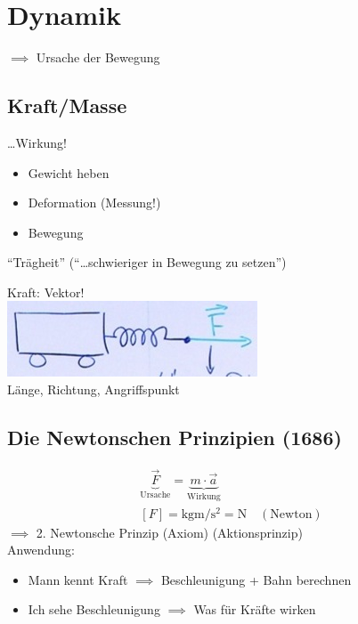 \section{Dynamik}
$\implies$ Ursache der Bewegung
\subsection{Kraft/Masse}
\begin{def*}[ note = Kraft , index = Kraft ]
	\dots Wirkung!
\end{def*}
\begin{bsp*}
	\begin{itemize}
		\item Gewicht heben
		\item Deformation (Messung!)
		\item Bewegung
	\end{itemize}
\end{bsp*}
\begin{def*}[ note = Masse , index = Masse ]
	\enquote{Trägheit} (\enquote{\dots schwieriger in Bewegung zu setzen})
\end{def*}
Kraft: Vektor! \\
\includegraphics{Bild19} \\
Länge, Richtung, Angriffspunkt

\subsection{Die Newtonschen Prinzipien (1686)}
\begin{gather*}
	\underbrace{\vec{F}}_{\text{Ursache}} = \underbrace{m \cdot \vec{a}}_{\text{Wirkung}} \\
	[F] = \si{\kilo\gram\metre\per\second\tothe{2}} = \si{\newton} \quad ( \text{Newton} )
\end{gather*}
$\implies$ 2. Newtonsche Prinzip (Axiom) (Aktionsprinzip) \\
Anwendung: \\
\begin{itemize}
	\item Mann kennt Kraft $\implies$ Beschleunigung + Bahn berechnen
	\item Ich sehe Beschleunigung $\implies$ Was für Kräfte wirken
\end{itemize}
